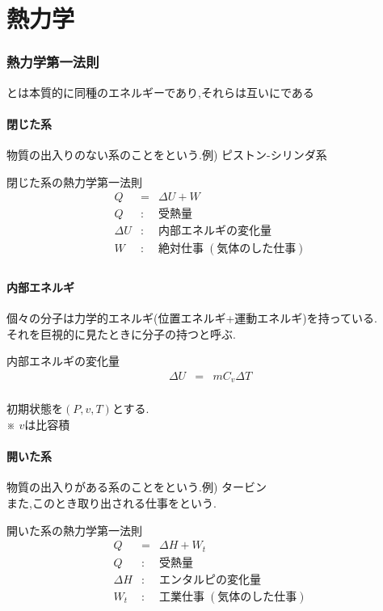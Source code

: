 \documentclass[a4paper]{jsarticle}
\begin{document}
\part{熱力学}
\section{熱力学第一法則}
\begin{screen}
    \begin{center}
        とは本質的に同種のエネルギーであり,それらは互いにである
    \end{center}
\end{screen}
\subsection{閉じた系}
物質の出入りのない系のことをという.\quad 例) ピストン-シリンダ系
\begin{itembox}[l]{閉じた系の熱力学第一法則}
    \begin{eqnarray*}
        Q&=&\Delta U+W\\
        Q&:&受熱量\\
        \Delta U&:&内部エネルギの変化量\\
        W&:&絶対仕事 \; (気体のした仕事)\\
    \end{eqnarray*}
\end{itembox}
\subsection{内部エネルギ}
個々の分子は力学的エネルギ(位置エネルギ+運動エネルギ)を持っている.\\
それを巨視的に見たときに分子の持つと呼ぶ.
\begin{itembox}[l]{内部エネルギの変化量}
    \begin{eqnarray*}
        \Delta U&=&mC_v\Delta T\\
    \end{eqnarray*}
\end{itembox}
初期状態を$\left(P,v,T\right)$とする.\\
※ $v$は比容積
\subsection{開いた系}
物質の出入りがある系のことをという.\quad 例) タービン\\
また,このとき取り出される仕事をという.
\begin{itembox}[l]{開いた系の熱力学第一法則}
    \begin{eqnarray*}
        Q&=&\Delta H+W_t\\
        Q&:&受熱量\\
        \Delta H&:&エンタルピの変化量\\
        W_t&:&工業仕事 \; (気体のした仕事)\\
    \end{eqnarray*}
\end{itembox}
\end{document}
